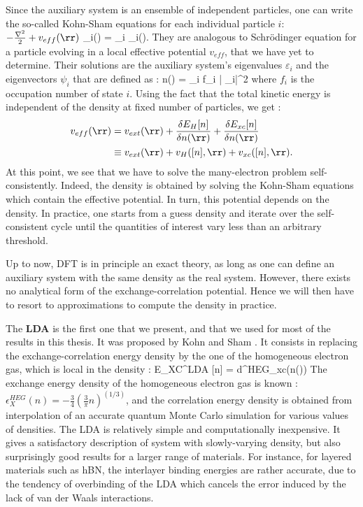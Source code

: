 Since the auxiliary system is an ensemble of independent particles, one can write the so-called Kohn-Sham equations for each individual particle $i$:
\be
 	\( -\frac{\nabla^2}{2} + v_{eff}(\rr)\) \psi_i(\rr) = \varepsilon_i \psi_i(\rr).
\ee
They are analogous to Schrödinger equation for a particle evolving in a local effective potential $v_{eff}$, that we have yet to determine. Their solutions are the auxiliary system's eigenvalues $\varepsilon_i$ and the eigenvectors $\psi_i$ that are defined as :
\be
 	n(\rr) = \sum_i f_i \left| \psi_i\right|^2
\ee
where $f_i$ is the occupation number of state $i$. Using the fact that the total kinetic energy is independent of the density at fixed number of particles, we get :
\begin{align}
\begin{split}
	v_{eff}(\rr) &= v_{ext}(\rr) + \frac{\delta E_H[n]}{\delta n(\rr)} + \frac{\delta E_{xc}[n]}{\delta n(\rr)} \\
	&\equiv v_{ext}(\rr) + v_H([n],\rr) + v_{xc}([n],\rr).
\end{split}
\end{align}
At this point, we see that we have to solve the many-electron problem self-consistently. Indeed, the density is obtained by solving the Kohn-Sham equations which contain the effective potential. In turn, this potential depends on the density. In practice, one starts from a guess density and iterate over the self-consistent cycle until the quantities of interest vary less than an arbitrary threshold.

Up to now, \gls{DFT} is in principle an exact theory, as long as one can define an auxiliary system with the same density as the real system. However, there exists no analytical form of the exchange-correlation potential. Hence we will then have to resort to approximations to compute the density in practice.

The \textbf{\gls{LDA}} is the first one that we present, and that we used for most of the results in this thesis. It was proposed by Kohn and Sham \cite{kohn}. It consists in replacing the exchange-correlation energy density by the one of the homogeneous electron gas, which is local in the density :
\be
	E_{XC}^{LDA} [n] = \int d\rr \epsilon^{HEG}_{xc}(n(\rr))
\ee
The exchange energy density of the homogeneous electron gas is known : $\epsilon_X^{HEG}(n) = -\tfrac{3}{4}(\tfrac{3}{\pi}n)^{(1/3)}$, and the correlation energy density is obtained from interpolation of an accurate quantum Monte Carlo simulation \cite{alder} for various values of densities. The LDA is relatively simple and computationally inexpensive. It gives a satisfactory description of system with slowly-varying density, but also surprisingly good results for a larger range of materials. For instance, for layered materials such as hBN, the interlayer binding energies are rather accurate, due to the tendency of overbinding of the LDA which cancels the error induced by the lack of van der Waals interactions.

